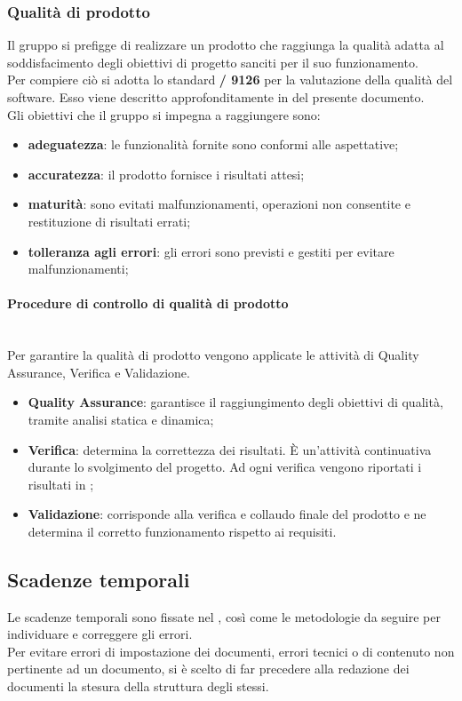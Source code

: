 \subsubsection{Qualità di prodotto}
Il gruppo si prefigge di realizzare un prodotto che raggiunga la qualità adatta al soddisfacimento degli obiettivi di progetto sanciti per il suo funzionamento.\\
Per compiere ciò si adotta lo standard \textbf{/ 9126} per la valutazione della qualità del software. Esso viene descritto approfonditamente in  del presente documento.\\
Gli obiettivi che il gruppo si impegna a raggiungere sono:
\begin{itemize}
	\item \textbf{adeguatezza}: le funzionalità fornite sono conformi alle aspettative;
	\item \textbf{accuratezza}: il prodotto fornisce i risultati attesi;
	\item  \textbf{maturità}: sono evitati malfunzionamenti, operazioni non consentite e restituzione di risultati errati;
	\item \textbf{tolleranza agli errori}: gli errori sono previsti e gestiti per evitare malfunzionamenti;
\end{itemize}


\paragraph{Procedure di controllo di qualità di prodotto}\mbox{}\\
Per garantire la qualità di prodotto vengono applicate le attività di Quality Assurance, Verifica e Validazione.
\begin{itemize}
	\item \textbf{Quality Assurance}: garantisce il raggiungimento degli obiettivi di qualità, tramite analisi statica e dinamica;
	\item \textbf{Verifica}: determina la correttezza dei risultati. \`{E} un’attività continuativa durante lo svolgimento del progetto. Ad ogni verifica vengono riportati i risultati in ;
	\item \textbf{Validazione}: corrisponde alla verifica e collaudo finale del prodotto e ne determina il corretto funzionamento rispetto ai requisiti.
\end{itemize}

\subsection{Scadenze temporali}
Le scadenze temporali sono fissate nel \PianoDiProgetto{}, così come le metodologie da seguire per individuare e correggere gli errori.\\
Per evitare errori di impostazione dei documenti, errori tecnici o di contenuto non pertinente ad un documento, si è scelto di far precedere alla redazione dei documenti la stesura della struttura degli stessi.
